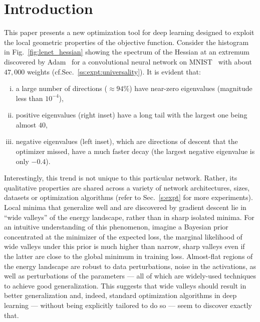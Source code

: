 \documentclass[10pt]{article}
\begin{document}
\section{Introduction}
\label{s:intro}
This paper presents a new optimization tool for deep learning designed to exploit the local geometric properties of the objective function. Consider the histogram in Fig.~\ref{fig:lenet_hessian} showing the spectrum of the Hessian at an extremum discovered by Adam~\citep{kingma2014adam} for a convolutional neural network on MNIST~\citep{lecun1998gradient} with about $47,000$ weights (cf.\@ Sec.~\ref{ss:expt:universality}). It is evident that:
\begin{enumerate}[(i)]
\item a large number of directions ($\approx 94\%$) have near-zero eigenvalues (magnitude less than $10^{-4}$),
\item positive eigenvalues (right inset) have a long tail with the largest one being almost $40$,
\item negative eigenvalues (left inset), which are directions of descent that the optimizer missed, have a much faster decay (the largest negative eigenvalue is only $-0.4$).
\end{enumerate}
Interestingly, this trend is not unique to this particular network. Rather, its qualitative properties are shared across a variety of network architectures, sizes, datasets or optimization algorithms (refer to Sec.~\ref{s:expt} for more experiments). Local minima that generalize well and are discovered by gradient descent lie in ``wide valleys'' of the energy landscape, rather than in sharp isolated minima. For an intuitive understanding of this phenomenon, imagine a Bayesian prior concentrated at the minimizer of the expected loss, the marginal likelihood of wide valleys under this prior is much higher than narrow, sharp valleys even if the latter are close to the global minimum in training loss. Almost-flat regions of the energy landscape are robust to data perturbations, noise in the activations, as well as perturbations of the parameters --- all of which are widely-used techniques to achieve good generalization. This suggests that wide valleys should result in better generalization and, indeed, standard optimization algorithms in deep learning --- without being explicitly tailored to do so --- seem to discover exactly that.
\end{document}
